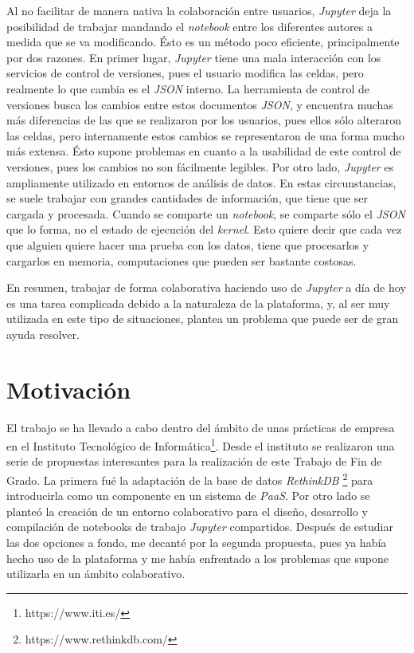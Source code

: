 \documentclass[11pt,spanish,listoffigures]{tfgetsinf}
\begin{document}
Al no facilitar de manera nativa la colaboración entre usuarios, \textit{Jupyter} deja la posibilidad de trabajar mandando el \textit{notebook} entre los diferentes autores a medida que se va modificando. Ésto es un método poco eficiente, principalmente por dos razones. En primer lugar, \textit{Jupyter} tiene una mala interacción con los servicios de control de versiones, pues el usuario modifica las celdas, pero realmente lo que cambia es el \textit{JSON} interno. La herramienta de control de versiones busca los cambios entre estos documentos \textit{JSON}, y encuentra muchas más diferencias de las que se realizaron por los usuarios, pues ellos sólo alteraron las celdas, pero internamente estos cambios se representaron de una forma mucho más extensa. Ésto supone problemas en cuanto a la usabilidad de este control de versiones, pues los cambios no son fácilmente legibles. 
Por otro lado, \textit{Jupyter} es ampliamente utilizado en entornos de análisis de datos. En estas circunstancias, se suele trabajar con grandes cantidades de información, que tiene que ser cargada y procesada. Cuando se comparte un \textit{notebook}, se comparte sólo el \textit{JSON} que lo forma, no el estado de ejecución del \textit{kernel}. Esto quiere decir que cada vez que alguien quiere hacer una prueba con los datos, tiene que procesarlos y cargarlos en memoria, computaciones que pueden ser bastante costosas.

En resumen, trabajar de forma colaborativa haciendo uso de \textit{Jupyter} a día de hoy es una tarea complicada debido a la naturaleza de la plataforma, y, al ser muy utilizada en este tipo de situaciones, plantea un problema que puede ser de gran ayuda resolver.



\section{Motivaci\'on}
\label{sec:motivacion}

El trabajo se ha llevado a cabo dentro del ámbito de unas prácticas de empresa en el Instituto Tecnológico de Informática\footnote{https://www.iti.es/}. Desde el instituto se realizaron una serie de propuestas interesantes para la realización de este Trabajo de Fin de Grado. La primera fué la adaptación de la base de datos \textit{RethinkDB} \footnote{https://www.rethinkdb.com/} para introducirla como un componente en un sistema de \textit{PaaS}. Por otro lado se planteó la creación de un entorno colaborativo para el diseño, desarrollo y compilación de notebooks de trabajo \textit{Jupyter} compartidos. Después de estudiar las dos opciones a fondo, me decanté por la segunda propuesta, pues ya había hecho uso de la plataforma y me había enfrentado a los problemas que supone utilizarla en un ámbito colaborativo.
\end{document}
